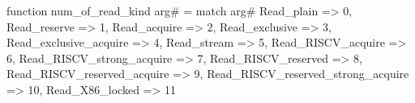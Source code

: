 function num_of_read_kind arg# = match arg# {
  Read_plain => 0,
  Read_reserve => 1,
  Read_acquire => 2,
  Read_exclusive => 3,
  Read_exclusive_acquire => 4,
  Read_stream => 5,
  Read_RISCV_acquire => 6,
  Read_RISCV_strong_acquire => 7,
  Read_RISCV_reserved => 8,
  Read_RISCV_reserved_acquire => 9,
  Read_RISCV_reserved_strong_acquire => 10,
  Read_X86_locked => 11
}
